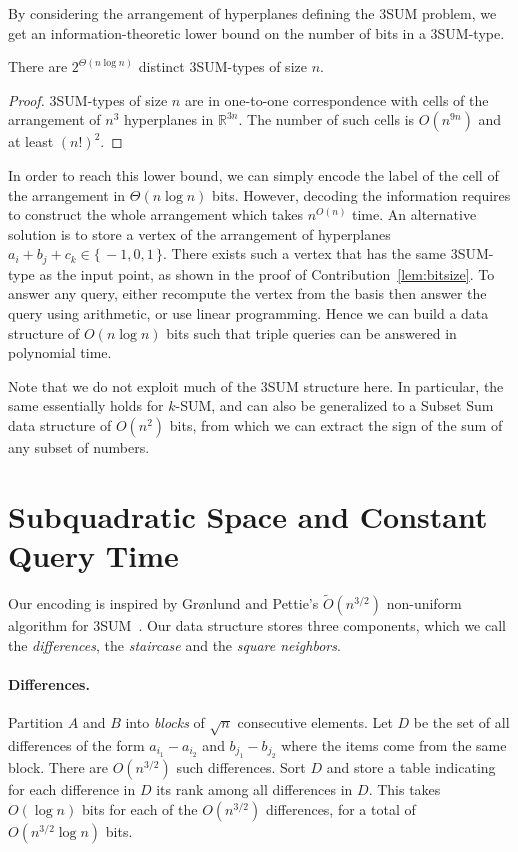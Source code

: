 By considering the arrangement of hyperplanes defining the 3SUM problem, we get an
information-theoretic lower bound on the number of bits in a 3SUM-type.

\begin{lemma}
  There are $2^{\Theta(n\log n)}$ distinct 3SUM-types of size $n$.
\end{lemma}
\begin{proof}
  3SUM-types of size $n$ are in one-to-one correspondence with cells of the
  arrangement of $n^3$ hyperplanes in $\mathbb{R}^{3n}$. The
  number of such cells is $O(n^{9n})$ and at least ${(n!)}^2$.
\end{proof}

In order to reach this lower bound, we can simply
encode the label of the cell of the arrangement in \(\Theta(n \log n)\) bits.
However, decoding the information
requires to construct the whole arrangement which takes \(n^{O(n)}\) time.
An alternative solution is to store a
vertex of the arrangement of hyperplanes \(a_i + b_j + c_k \in \{\,
-1, 0, 1\,\}\).
There exists such a vertex that has the same 3SUM-type as the input point, as
shown in the proof of Contribution~\ref{lem:bitsize}.
To answer any query, either recompute the vertex from the basis then answer the query using arithmetic,
or use linear programming.
Hence we can build a data structure of $O(n\log n)$ bits such that triple queries can be answered in polynomial time.

Note that we do not exploit much of the 3SUM structure here. In particular, the
same essentially holds for $k$-SUM, and can also be generalized to a {\sc
Subset Sum} data structure of $O(n^2)$ bits, from which we can extract the sign
of the sum of any subset of numbers.

\section{Subquadratic Space and Constant Query Time}%
\label{s:sscqt}

Our encoding is inspired by  Gr{\o}nlund and Pettie's $\tilde{O}(n^{3/2})$
non-uniform algorithm for 3SUM~\cite{GP18}.
Our data structure stores three components, which we call the
\emph{differences}, the \emph{staircase} and the \emph{square neighbors}.

\paragraph{Differences.}
  Partition $A$ and $B$ into \emph{blocks} of $\sqrt{n}$ consecutive elements.
  Let $D$ be the set of all differences of the form $a_{i_1}-a_{i_2}$ and
  $b_{j_1}-b_{j_2}$
  where the items come from the same block. There are $O(n^{3/2})$ such
  differences. Sort $D$ and store a table indicating for each difference in $D$
  its rank among all differences in $D$. This takes $O(\log n)$ bits for each
  of the $O(n^{3/2})$ differences, for a total of $O(n^{3/2}\log n)$ bits.

